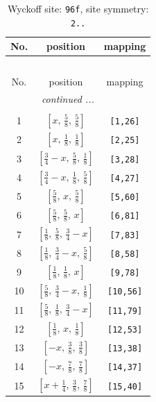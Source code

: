 \documentclass[fleqn,8pt]{jsarticle}
\begin{document}
\begin{longtable}{ccc}
\caption{Wyckoff site: {\tt 96f}, site symmetry: {\tt 2..}}
 \\
 \hline \hline
No. & position & mapping \\ \hline \endfirsthead

\multicolumn{2}{l}{\tablename\ \thetable{}} \\
 \hline \hline
No. & position & mapping \\ \hline \endhead

 \hline \hline
\multicolumn{2}{r}{\footnotesize\it continued ...} \\ \endfoot

 \hline \hline
\multicolumn{2}{r}{} \\ \endlastfoot

1 & $\left[ x,\, \frac{5}{8},\, \frac{5}{8} \right]$ & {\tt [1,26]} \\ \hline
2 & $\left[ x,\, \frac{1}{8},\, \frac{1}{8} \right]$ & {\tt [2,25]} \\ \hline
3 & $\left[ \frac{3}{4} - x,\, \frac{5}{8},\, \frac{1}{8} \right]$ & {\tt [3,28]} \\ \hline
4 & $\left[ \frac{3}{4} - x,\, \frac{1}{8},\, \frac{5}{8} \right]$ & {\tt [4,27]} \\ \hline
5 & $\left[ \frac{5}{8},\, x,\, \frac{5}{8} \right]$ & {\tt [5,60]} \\ \hline
6 & $\left[ \frac{5}{8},\, \frac{5}{8},\, x \right]$ & {\tt [6,81]} \\ \hline
7 & $\left[ \frac{1}{8},\, \frac{5}{8},\, \frac{3}{4} - x \right]$ & {\tt [7,83]} \\ \hline
8 & $\left[ \frac{1}{8},\, \frac{3}{4} - x,\, \frac{5}{8} \right]$ & {\tt [8,58]} \\ \hline
9 & $\left[ \frac{1}{8},\, \frac{1}{8},\, x \right]$ & {\tt [9,78]} \\ \hline
10 & $\left[ \frac{5}{8},\, \frac{3}{4} - x,\, \frac{1}{8} \right]$ & {\tt [10,56]} \\ \hline
11 & $\left[ \frac{5}{8},\, \frac{1}{8},\, \frac{3}{4} - x \right]$ & {\tt [11,79]} \\ \hline
12 & $\left[ \frac{1}{8},\, x,\, \frac{1}{8} \right]$ & {\tt [12,53]} \\ \hline
13 & $\left[ - x,\, \frac{3}{8},\, \frac{3}{8} \right]$ & {\tt [13,38]} \\ \hline
14 & $\left[ - x,\, \frac{7}{8},\, \frac{7}{8} \right]$ & {\tt [14,37]} \\ \hline
15 & $\left[ x + \frac{1}{4},\, \frac{3}{8},\, \frac{7}{8} \right]$ & {\tt [15,40]} \\ \hline

\end{longtable}
\end{document}
